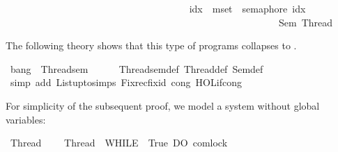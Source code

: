 \begin{isabellebody}
\ \ \ \ \ \ \ \ \ \ \ \ \ \ \ \ \ \ {\isacharbar}{\kern0pt}{\isacharbar}{\kern0pt}{\isacharbar}{\kern0pt}\isanewline
\ \ \ \ \ \ \ \ \ \ \ \ \ \ \ \ \ \ \isactrlbold {\isacharbar}{\kern0pt}\isactrlbold {\isacharbar}{\kern0pt}\isactrlbold {\isacharbar}{\kern0pt}\ idx\ {\isasymin}{\isacharhash}{\kern0pt}\ mset\ {\isacharbrackleft}{\kern0pt}{}{\isachardot}{\kern0pt}{\isachardot}{\kern0pt}{}{\isacharbrackright}{\kern0pt}{\isachardot}{\kern0pt}\ semaphore\ idx\ {\isacharparenright}{\kern0pt}\isanewline
\ \ \ \ \ \ \ \ \ \ \ \ \ \ \ \ \ \isanewline
\ \ \ \ \ \ \ \ \ \ \ \ \ \ \ \ {\isacharbar}{\kern0pt}{\isacharbar}{\kern0pt}\isanewline
\ \ \ \isanewline
\ \ \ \ \ \ \ \ \ \ \ \ \ \ \ \ \ \ {\isacharparenleft}{\kern0pt}Sem\ Thread{}{\isacharparenright}{\kern0pt}{\isachardoublequoteclose}%
\begin{isamarkuptext}%
The following theory shows that this type of programs collapses to \isa{{\isasymbottom}}.%
\end{isamarkuptext}\isamarkuptrue%
\isamarkupfalse%
\ bang\ {\isacharcolon}{\kern0pt}\ {\isacartoucheopen}Thread{}{\isacharunderscore}{\kern0pt}sem\ {\isacharequal}{\kern0pt}\ {\isasymbottom}{\isacartoucheclose}\isanewline
%
\isadelimproof
\ \ %
\endisadelimproof
%
\isatagproof
{}\isamarkupfalse%
\ Thread{}{\isacharunderscore}{\kern0pt}sem{\isacharunderscore}{\kern0pt}def\ Thread{}{\isacharunderscore}{\kern0pt}def\ Sem{\isacharunderscore}{\kern0pt}def\isanewline
\ \ \isamarkupfalse%
\ {\isacharparenleft}{\kern0pt}simp\ add{\isacharcolon}{\kern0pt}\ List{\isachardot}{\kern0pt}upto{\isachardot}{\kern0pt}simps\ Fixrec{\isachardot}{\kern0pt}fix{\isacharunderscore}{\kern0pt}id\ cong{\isacharcolon}{\kern0pt}\ HOL{\isachardot}{\kern0pt}if{\isacharunderscore}{\kern0pt}cong{\isacharparenright}{\kern0pt}%
\endisatagproof
{\isafoldproof}%
%
\isadelimproof
%
\endisadelimproof
%
\isadelimdocument
%
\endisadelimdocument
%
\isatagdocument
%
\isamarkuptrue%
%
\endisatagdocument
{\isafolddocument}%
%
\isadelimdocument
%
\endisadelimdocument
%
\begin{isamarkuptext}%
For simplicity of the subsequent proof, we model a system without global variables:%
\end{isamarkuptext}\isamarkuptrue%
\isamarkupfalse%
\ Thread{}\ \ \isanewline
\ \ {\isachardoublequoteopen}Thread{}\ {\isacharequal}{\kern0pt}\ WHILE\ {\isacharparenleft}{\kern0pt}{\isasymlambda}{\isasymsigma}{\isachardot}{\kern0pt}\ True{\isacharparenright}{\kern0pt}\ DO\ {\isacharparenleft}{\kern0pt}com{\isachardot}{\kern0pt}lock\ {}{\isacharparenright}{\kern0pt}{\isachardoublequoteclose}\isanewline

\end{isabellebody}
